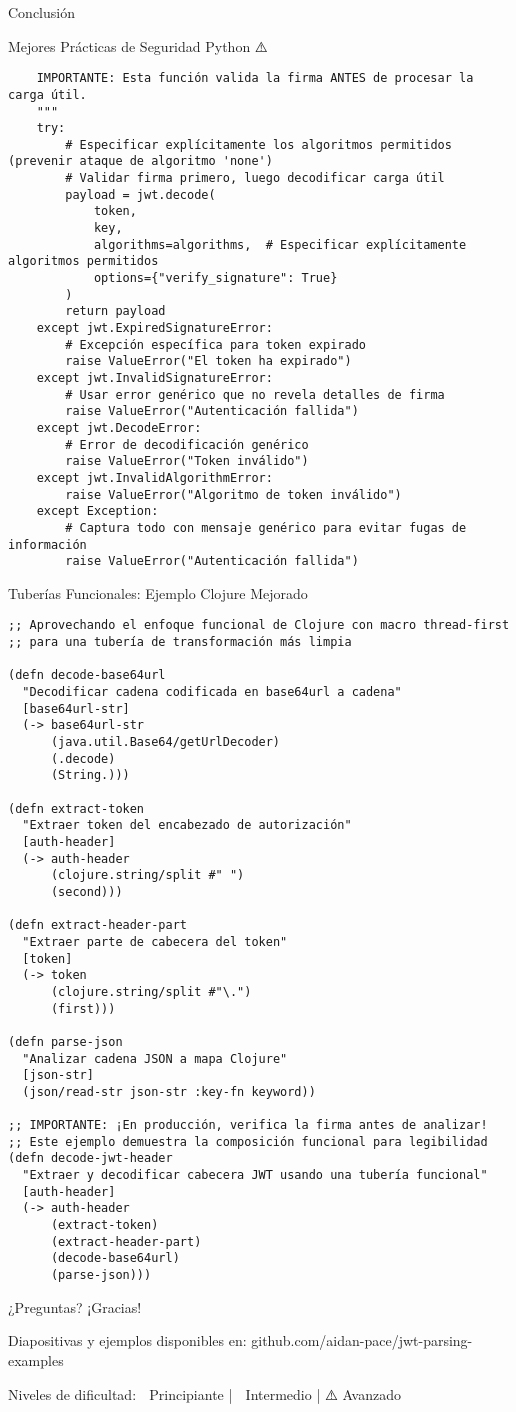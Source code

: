 \documentclass[presentation,aspectratio=169]{beamer}
\begin{document}
\begin{frame}[label={sec:org8853002},fragile]{Conclusión}
\begin{block}{Mejores Prácticas de Seguridad Python ⚠️}
\begin{verbatim}
    IMPORTANTE: Esta función valida la firma ANTES de procesar la carga útil.
    """
    try:
        # Especificar explícitamente los algoritmos permitidos (prevenir ataque de algoritmo 'none')
        # Validar firma primero, luego decodificar carga útil
        payload = jwt.decode(
            token,
            key,
            algorithms=algorithms,  # Especificar explícitamente algoritmos permitidos
            options={"verify_signature": True}
        )
        return payload
    except jwt.ExpiredSignatureError:
        # Excepción específica para token expirado
        raise ValueError("El token ha expirado")
    except jwt.InvalidSignatureError:
        # Usar error genérico que no revela detalles de firma
        raise ValueError("Autenticación fallida")
    except jwt.DecodeError:
        # Error de decodificación genérico
        raise ValueError("Token inválido")
    except jwt.InvalidAlgorithmError:
        raise ValueError("Algoritmo de token inválido")
    except Exception:
        # Captura todo con mensaje genérico para evitar fugas de información
        raise ValueError("Autenticación fallida")
\end{verbatim}
\end{block}
\begin{block}{Tuberías Funcionales: Ejemplo Clojure Mejorado 🧩}
\begin{verbatim}
;; Aprovechando el enfoque funcional de Clojure con macro thread-first
;; para una tubería de transformación más limpia

(defn decode-base64url
  "Decodificar cadena codificada en base64url a cadena"
  [base64url-str]
  (-> base64url-str
      (java.util.Base64/getUrlDecoder)
      (.decode)
      (String.)))

(defn extract-token
  "Extraer token del encabezado de autorización"
  [auth-header]
  (-> auth-header
      (clojure.string/split #" ")
      (second)))

(defn extract-header-part
  "Extraer parte de cabecera del token"
  [token]
  (-> token
      (clojure.string/split #"\.")
      (first)))

(defn parse-json
  "Analizar cadena JSON a mapa Clojure"
  [json-str]
  (json/read-str json-str :key-fn keyword))

;; IMPORTANTE: ¡En producción, verifica la firma antes de analizar!
;; Este ejemplo demuestra la composición funcional para legibilidad
(defn decode-jwt-header
  "Extraer y decodificar cabecera JWT usando una tubería funcional"
  [auth-header]
  (-> auth-header
      (extract-token)
      (extract-header-part)
      (decode-base64url)
      (parse-json)))
\end{verbatim}
\end{block}
\begin{block}{¿Preguntas?}
¡Gracias!

\alert{Diapositivas y ejemplos disponibles en:} 
github.com/aidan-pace/jwt-parsing-examples

\alert{Niveles de dificultad:} 🔰 Principiante | 🧩 Intermedio | ⚠️ Avanzado
\end{block}
\end{frame}
\end{document}
